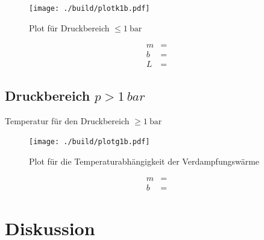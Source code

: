\begin{figure}[H]
    \centering
    \texttt{[image: ./build/plotk1b.pdf]}
    \caption{Plot für Druckbereich $\leq \SI{1}{\bar}$}
    \label{fig:4}
\end{figure}

\begin{align}
    m &= \text{} \label{eq:}\\
    b &= \text{} \label{eq:}\\
    L &= \text{}
\end{align}

\subsection{Druckbereich $p > \SI{1}{bar}$}

\begin{table}
    \centering
    
    \caption{Temperatur für den Druckbereich $\geq \SI{1}{\bar}$}
    \label{tab:2}
\end{table}

\begin{figure}[H]
    \centering
    \texttt{[image: ./build/plotg1b.pdf]}
    \caption{Plot für die Temperaturabhängigkeit der Verdampfungswärme}
    \label{fig:5}
\end{figure}

\begin{align}
    m &= \text{}\\
    b &= \text{}
\end{align}


\section{Diskussion}


\newpage
\printbibliography


